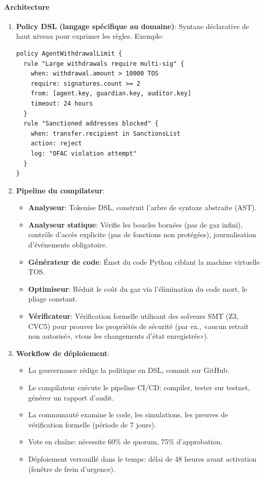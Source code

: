 \documentclass[11pt]{article}
\begin{document}
\paragraph{Architecture}
\begin{enumerate}[noitemsep]
  \item \textbf{Policy DSL (langage spécifique au domaine)}: Syntaxe déclarative de haut niveau pour exprimer les règles. Exemple:
  \begin{verbatim}
policy AgentWithdrawalLimit {
  rule "Large withdrawals require multi-sig" {
    when: withdrawal.amount > 10000 TOS
    require: signatures.count >= 2
    from: [agent.key, guardian.key, auditor.key]
    timeout: 24 hours
  }
  rule "Sanctioned addresses blocked" {
    when: transfer.recipient in SanctionsList
    action: reject
    log: "OFAC violation attempt"
  }
}
  \end{verbatim}
  \item \textbf{Pipeline du compilateur}:
    \begin{itemize}[noitemsep]
      \item \textbf{Analyseur}: Tokenise DSL, construit l'arbre de syntaxe abstraite (AST).
      \item \textbf{Analyseur statique}: Vérifie les boucles bornées (pas de gaz infini), contrôle d'accès explicite (pas de fonctions non protégées), journalisation d'événements obligatoire.
      \item \textbf{Générateur de code}: Émet du code Python ciblant la machine virtuelle TOS.
      \item \textbf{Optimiseur}: Réduit le coût du gaz via l'élimination du code mort, le pliage constant.
      \item \textbf{Vérificateur}: Vérification formelle utilisant des solveurs SMT (Z3, CVC5) pour prouver les propriétés de sécurité (par ex., «aucun retrait non autorisé», «tous les changements d'état enregistrés»).
    \end{itemize}
  \item \textbf{Workflow de déploiement}:
    \begin{itemize}[noitemsep]
      \item La gouvernance rédige la politique en DSL, commit sur GitHub.
      \item Le compilateur exécute le pipeline CI/CD: compiler, tester sur testnet, générer un rapport d'audit.
      \item La communauté examine le code, les simulations, les preuves de vérification formelle (période de 7 jours).
      \item Vote en chaîne: nécessite 60\% de quorum, 75\% d'approbation.
      \item Déploiement verrouillé dans le temps: délai de 48 heures avant activation (fenêtre de frein d'urgence).
    \end{itemize}
\end{enumerate}
\end{document}
